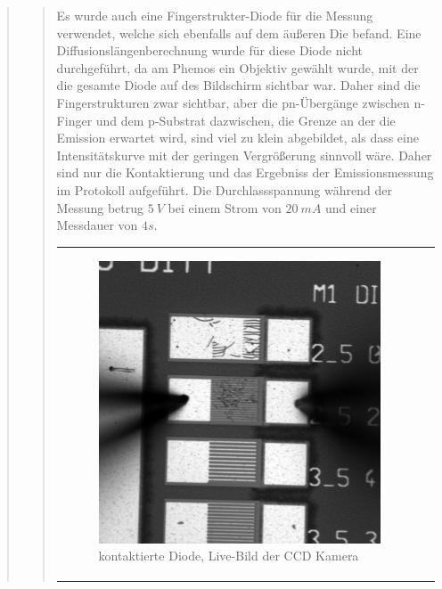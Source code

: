 \begin{quote}
\begin{quote}
        Es wurde auch eine Fingerstrukter-Diode für die Messung verwendet,
        welche sich ebenfalls auf dem äußeren Die befand. Eine
        Diffusionslängenberechnung wurde für diese Diode nicht durchgeführt, da
        am Phemos ein Objektiv gewählt wurde, mit der die gesamte Diode auf des
        Bildschirm sichtbar war. Daher sind die Fingerstrukturen zwar sichtbar,
        aber die pn-Übergänge zwischen n-Finger und dem p-Substrat dazwischen,
        die Grenze an der die Emission erwartet wird, sind viel zu klein
        abgebildet, als dass eine Intensitätskurve mit der geringen Vergrößerung
        sinnvoll wäre. Daher sind nur die Kontaktierung und das Ergebniss der
        Emissionsmessung im Protokoll aufgeführt. Die Durchlassspannung während
        der Messung betrug $5\ V$ bei einem Strom von $20\ mA$ und einer
        Messdauer von $4s$. 
        
        
            \begin{center}
                \begin{tabular}{ll}
    
                \hspace{-10em}
                    \begin{minipage}{0.6\textwidth}
    
                        \begin{figure}[H]
                            \label{fig:}
                            \includegraphics[scale=0.25, trim = 0cm 0cm 0cm
                            0cm,
                            clip]{./Emissionsbilder/fuenf/nach_Kontaktierung.jpg}
                            \caption{kontaktierte Diode, Live-Bild der CCD
                            Kamera}
                        \end{figure}
    

\end{minipage}
\end{tabular}
\end{center}
\end{quote}
\end{quote}
